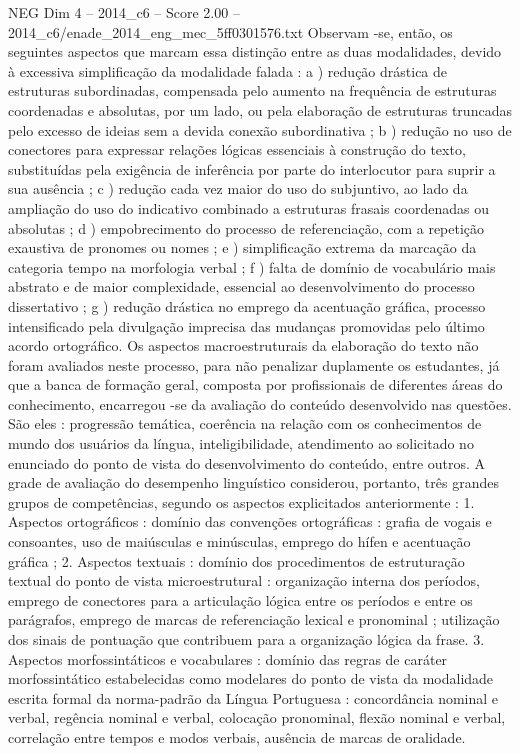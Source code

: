 \begin{textsample}{NEG Dim 4 – 2014\_c6 – Score 2.00 – 2014\_c6/enade\_2014\_eng\_mec\_5ff0301576.txt}
Observam -se, então, os seguintes aspectos que marcam essa distinção entre as duas modalidades, devido à excessiva simplificação da modalidade falada : a ) redução drástica de estruturas subordinadas, compensada pelo aumento na frequência de estruturas coordenadas e absolutas, por um lado, ou pela elaboração de estruturas truncadas pelo excesso de ideias sem a devida conexão subordinativa ; b ) redução no uso de conectores para expressar relações lógicas essenciais à construção do texto, substituídas pela exigência de inferência por parte do interlocutor para suprir a sua ausência ; c ) redução cada vez maior do uso do subjuntivo, ao lado da ampliação do uso do indicativo combinado a estruturas frasais coordenadas ou absolutas ; d ) empobrecimento do processo de referenciação, com a repetição exaustiva de pronomes ou nomes ; e ) simplificação extrema da marcação da categoria tempo na morfologia verbal ; f ) falta de domínio de vocabulário mais abstrato e de maior complexidade, essencial ao desenvolvimento do processo dissertativo ; g ) redução drástica no emprego da acentuação gráfica, processo intensificado pela divulgação imprecisa das mudanças promovidas pelo último acordo ortográfico.
Os aspectos macroestruturais da elaboração do texto não foram avaliados neste processo, para não penalizar duplamente os estudantes, já que a banca de formação geral, composta por profissionais de diferentes áreas do conhecimento, encarregou -se da avaliação do conteúdo desenvolvido nas questões.
São eles : progressão temática, coerência na relação com os conhecimentos de mundo dos usuários da língua, inteligibilidade, atendimento ao solicitado no enunciado do ponto de vista do desenvolvimento do conteúdo, entre outros.
A grade de avaliação do desempenho linguístico considerou, portanto, três grandes grupos de competências, segundo os aspectos explicitados anteriormente : 1.
Aspectos ortográficos : domínio das convenções ortográficas : grafia de vogais e consoantes, uso de maiúsculas e minúsculas, emprego do hífen e acentuação gráfica ; 2.
Aspectos textuais : domínio dos procedimentos de estruturação textual do ponto de vista microestrutural : organização interna dos períodos, emprego de conectores para a articulação lógica entre os períodos e entre os parágrafos, emprego de marcas de referenciação lexical e pronominal ; utilização dos sinais de pontuação que contribuem para a organização lógica da frase. 3.
Aspectos morfossintáticos e vocabulares : domínio das regras de caráter morfossintático estabelecidas como modelares do ponto de vista da modalidade escrita formal da norma-padrão da Língua Portuguesa : concordância nominal e verbal, regência nominal e verbal, colocação pronominal, flexão nominal e verbal, correlação entre tempos e modos verbais, ausência de marcas de oralidade.

\end{textsample}
